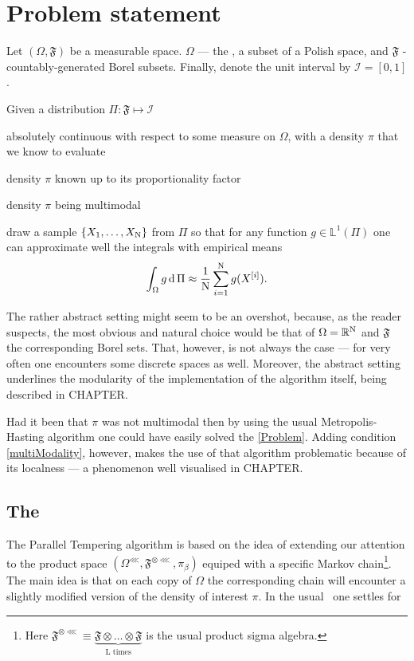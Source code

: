 \section*{Problem statement}

Let $(\Omega, \mathfrak{F})$ be a measurable space. $\Omega$ --- the \sspace, a subset of a Polish space, and $\mathfrak{F}$ - countably-generated Borel subsets. Finally, denote the unit interval by $\mathcal{I} = [0,1]$. 

\begin{Problem}
	\item{\label{Problem}
		Given a distribution $\Pi: \mathfrak{F} \mapsto \mathcal{I}$
		\begin{Problem}
		 	\item absolutely continuous with respect to some measure on $\Omega$, with a density $\pi$ that we know to evaluate 
		 	\item density $\pi$ known up to its proportionality factor
		 	\item \label{multiModality}density $\pi$ being multimodal
		\end{Problem} 
		draw a sample $\{ X_1, \dots, X_{\mathrm{N}} \}$ from $\Pi$ so that for any function $g \in \mathbb{L}^1(\Pi)$ one can approximate well the integrals with empirical means
		$$\int_\Omega g \,\mathrm{d }\,\Pi \approx \frac{1}{\mathrm{N}}\sum_{i = 1}^{\mathrm{N}} g(X^{[i]}). $$ 
	}
\end{Problem}

The rather abstract setting might seem to be an overshot, because, as the reader suspects, the most obvious and natural choice would be that of $\Omega = \mathbb{R}^{\mathrm{N}}$ and $\mathfrak{F}$ the corresponding Borel sets. That, however, is not always the case --- for very often one encounters some discrete spaces as well. Moreover, the abstract setting underlines the modularity of the implementation of the algorithm itself, being described in CHAPTER.

Had it been that $\pi$ was not multimodal then by using the usual Metropolis-Hasting algorithm one could have easily solved the \ref{Problem}. Adding condition \ref{multiModality}, however, makes the use of that algorithm problematic because of its localness --- a phenomenon well visualised in CHAPTER.


\subsection*{The \PT} 
The Parallel Tempering algorithm is based on the idea of extending our attention to the product space $(\Omega^\lll, \mathfrak{F}^{\otimes \lll}, \pi_\beta)$ equiped with a specific Markov chain\footnote{Here $\mathfrak{F}^{\otimes \lll} \equiv \underbrace{\mathfrak{F} \otimes \dots \otimes \mathfrak{F}}_{\text{L times}}$ is the usual product sigma algebra.}. The main idea is that on each copy of $\Omega$ the corresponding chain will encounter a slightly modified version of the density of interest $\pi$. In the usual \PT\, one settles for 

